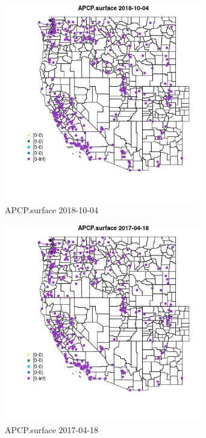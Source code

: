 \begin{figure} 
\centering  
\includegraphics[width=0.77\textwidth]{Code_Outputs/Report_ML_input_PM25_Step4_part_f_de_duplicated_aves_prioritize_24hr_obswNAs_MapObsAPCPsurface2018-10-04.jpg} 
\caption{\label{fig:Report_ML_input_PM25_Step4_part_f_de_duplicated_aves_prioritize_24hr_obswNAsMapObsAPCPsurface2018-10-04}APCP.surface 2018-10-04} 
\end{figure} 
 

\clearpage 

\begin{figure} 
\centering  
\includegraphics[width=0.77\textwidth]{Code_Outputs/Report_ML_input_PM25_Step4_part_f_de_duplicated_aves_prioritize_24hr_obswNAs_MapObsAPCPsurface2017-04-18.jpg} 
\caption{\label{fig:Report_ML_input_PM25_Step4_part_f_de_duplicated_aves_prioritize_24hr_obswNAsMapObsAPCPsurface2017-04-18}APCP.surface 2017-04-18} 
\end{figure} 
 

